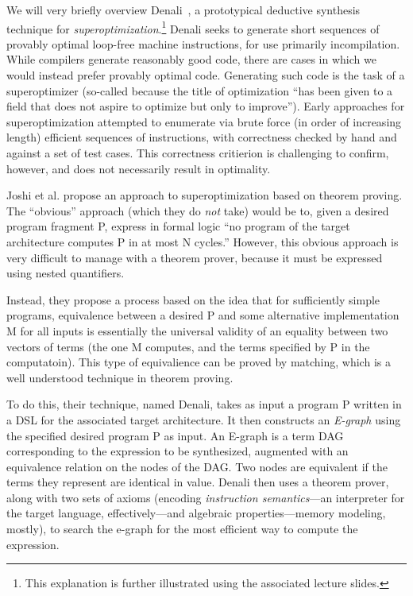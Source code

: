 \documentclass[11pt]{article}
\begin{document}
We will very briefly overview Denali~\cite{Joshi2002}, a prototypical
deductive synthesis technique for \emph{superoptimization}.\footnote{This
  explanation is further illustrated using the associated lecture slides.}
Denali seeks to generate short sequences of provably optimal loop-free machine
instructions, for use primarily incompilation. While compilers generate
reasonably good code, there are cases in which we would instead prefer provably
optimal code. Generating such code is the task of a superoptimizer (so-called
because the title of optimization ``has been given to a field that does not
aspire to optimize but only to improve''). Early approaches for
superoptimization attempted to enumerate via brute force (in order of increasing
length) efficient sequences of instructions, with correctness checked by hand
and against a set of test cases. This correctness critierion is challenging to
confirm, however, and does not necessarily result in optimality.

Joshi et al. propose an approach to superoptimization based on theorem proving.
The ``obvious'' approach (which they do \emph{not} take) would be to, given a
desired program fragment P, express in formal logic ``no program of the target
architecture computes P in at most N cycles.''  However, this obvious approach
is very difficult to manage with a theorem prover, because it must be expressed
using nested quantifiers. 

Instead, they propose a process based on the idea that for sufficiently simple
programs, equivalence between a desired P and some alternative implementation M
for all inputs is essentially the universal validity of an equality between two
vectors of terms (the one M computes, and the terms specified by P in the
computatoin). This type of equivalience can be proved by matching, which is a
well understood technique in theorem proving.

To do this, their technique, named Denali, takes as input a program P written in
a DSL for the associated target architecture. It then constructs an
\emph{E-graph} using the specified desired program P as input. An E-graph is a
term DAG corresponding to the expression to be synthesized, augmented with an
equivalence relation on the nodes of the DAG. Two nodes are equivalent if the
terms they represent are identical in value.
%
Denali then uses a theorem prover, along with two sets of axioms (encoding
\emph{instruction semantics}---an interpreter for the target language,
effectively---and algebraic properties---memory modeling, mostly), to search the
e-graph for the most efficient way to compute the expression.  
\end{document}
